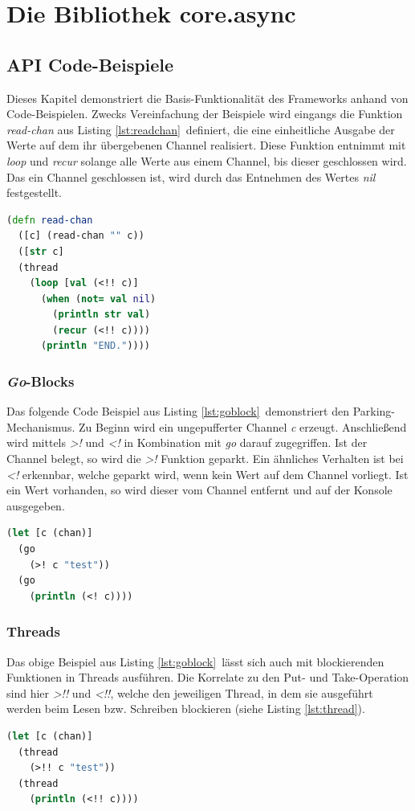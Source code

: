 \documentclass[12pt,a4paper,parskip=half,listof=totoc]{scrreprt}
\begin{document}
\section{Die Bibliothek core.async}

\subsection{\acs{API} Code-Beispiele}
Dieses Kapitel demonstriert die Basis-Funktionalität des Frameworks anhand von Code-Beispielen. Zwecks Vereinfachung der Beispiele wird eingangs die Funktion \textit{read-chan} aus Listing \ref{lst:readchan}\  definiert, die eine einheitliche Ausgabe der Werte auf dem ihr übergebenen Channel realisiert. Diese Funktion entnimmt mit \textit{loop} und \textit{recur} solange alle Werte aus einem Channel, bis dieser geschlossen wird. Das ein Channel geschlossen ist, wird durch das Entnehmen des Wertes \textit{nil} festgestellt.
\begin{lstlisting}[language=Clojure,caption=\textit{read-chan} Hilfsfunktion,label=lst:readchan]
(defn read-chan
  ([c] (read-chan "" c))
  ([str c]
  (thread
    (loop [val (<!! c)]
      (when (not= val nil)
        (println str val)
        (recur (<!! c))))
      (println "END."))))
\end{lstlisting}
\subsubsection{\textit{Go}-Blocks}
Das folgende Code Beispiel aus Listing \ref{lst:goblock}\ demonstriert den Parking-Mechanismus. Zu Beginn wird  ein ungepufferter Channel \textit{c} erzeugt. Anschließend wird mittels \textit{>!} und \textit{<!} in Kombination mit \textit{go} darauf zugegriffen. Ist der Channel belegt, so wird die \textit{>!} Funktion geparkt. Ein ähnliches Verhalten ist bei \textit{<!} erkennbar, welche geparkt wird, wenn kein Wert auf dem Channel vorliegt. Ist ein Wert vorhanden, so wird dieser vom Channel entfernt und auf der Konsole ausgegeben.
\begin{lstlisting}[language=Clojure,caption=\textit{Go}-Blocks,label=lst:goblock]
(let [c (chan)]
  (go
    (>! c "test"))
  (go
    (println (<! c))))
\end{lstlisting}
\subsubsection{Threads}
Das obige Beispiel aus Listing \ref{lst:goblock}\ lässt sich auch mit blockierenden Funktionen in Threads ausführen. Die Korrelate zu den Put- und Take-Operation sind hier \textit{>!!} und \textit{<!!}, welche den jeweiligen Thread, in dem sie ausgeführt werden beim Lesen bzw. Schreiben blockieren (siehe Listing \ref{lst:thread}).
\begin{lstlisting}[language=Clojure,caption=Thread,label=lst:thread]
(let [c (chan)]
  (thread
    (>!! c "test"))
  (thread
    (println (<!! c))))
\end{lstlisting}
\end{document}
